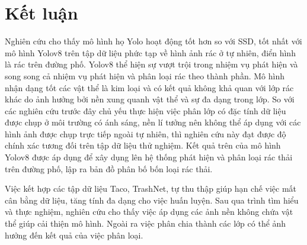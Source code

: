 \documentclass[../the.tex]{subfiles}
\begin{document}
\section{Kết luận}

{\fontsize{13}{12} \selectfont
Nghiên cứu cho thấy mô hình họ Yolo hoạt động tốt hơn so với SSD, tốt nhất với mô hình Yolov8 trên tập dữ liệu phức tạp về hình ảnh rác ở tự nhiên, điển hình là rác trên đường phố.
Yolov8 thể hiện sự vượt trội trong nhiệm vụ phát hiện và song song cả nhiệm vụ phát hiện và phân loại rác theo thành phần.
Mô hình nhận dạng tốt các vật thể là kim loại và có kết quả không khả quan với lớp rác khác do ảnh hưởng bởi nền xung quanh vật thể và sự đa dạng trong lớp.
So với các nghiên cứu trước đây chủ yếu thực hiện việc phân lớp có đặc tính dữ liệu được chụp ở môi trường có ánh sáng, nền lí tưởng nên không thể áp dụng với các hình ảnh được chụp trực tiếp ngoài tự nhiên, thì nghiên cứu này đạt được độ chính xác tương đối trên tập dữ liệu thử nghiệm.
Kết quả trên của mô hình Yolov8 được áp dụng để xây dụng lên hệ thống phát hiện và phân loại rác thải trên đường phố, lập ra bản đồ phân bố bốn loại rác thải.
\selectfont }

\bigskip

{\fontsize{13}{12} \selectfont 
Việc kết hợp các tập dữ liệu Taco, TrashNet, tự thu thập giúp hạn chế việc mất cân bằng dữ liệu, tăng tính đa dạng cho việc huấn luyện.
Sau qua trình tìm hiểu và thực nghiệm, nghiên cứu cho thấy việc áp dụng các ảnh nền không chứa vật thể giúp cải thiện mô hình. Ngoài ra việc phân chia thành các lớp có thể ảnh hưởng đến kết quả của việc phân loại.
}
\end{document}
